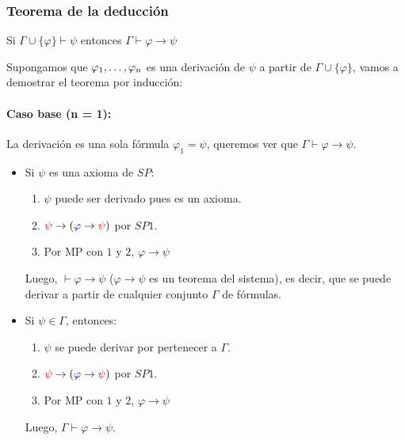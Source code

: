\subsubsection{Teorema de la deducción}
\begin{teorema}\label{teorema::deduccion}
	Si $\Gamma\cup\{\varphi\}\vdash\psi$ entonces $\Gamma\vdash\varphi\rightarrow\psi$ 
\end{teorema}

\begin{demo}
	Supongamos que $\varphi_1,\dots, \varphi_{n}$ es una derivación de $\psi$ a partir de $\Gamma\cup\{\varphi\}$, vamos a demostrar el teorema por inducción:

	\paragraph{Caso base (n = 1):} La derivación es una sola fórmula $\varphi_1 = \psi$, queremos ver que $\Gamma\vdash\varphi\rightarrow\psi$.
	\begin{itemize}
		\item Si $\psi$ es una axioma de $SP$:
		\begin{enumerate}
			\item $\psi$ puede ser derivado pues es un axioma.
			\item ${\color{red}\psi}\rightarrow({\color{blue}\varphi}\rightarrow {\color{red}\psi})$ por $SP1$.
			\item Por MP con $1$ y $2$, $\varphi\rightarrow\psi$
		\end{enumerate}
	Luego, $\vdash\varphi\rightarrow\psi$ ($\varphi\rightarrow\psi$ es un teorema del sistema), es decir, que se puede derivar a partir de cualquier conjunto $\Gamma$ de fórmulas.
	\item Si $\psi\in\Gamma$, entonces:
\begin{enumerate}
	\item $\psi$ se puede derivar por pertenecer a $\Gamma$.
	\item ${\color{red}\psi}\rightarrow({\color{blue}\varphi}\rightarrow {\color{red}\psi})$ por $SP1$.
	\item Por MP con $1$ y $2$, $\varphi\rightarrow\psi$
\end{enumerate}
		Luego, $\Gamma\vdash\varphi\rightarrow\psi$.
		\end{itemize}
			\end{demo}
